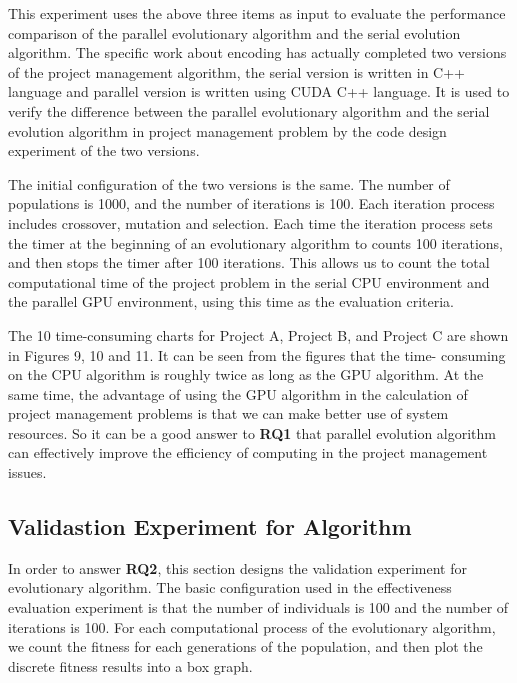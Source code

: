 
This experiment uses the above three items as input to evaluate the performance
comparison of the parallel evolutionary algorithm and the serial evolution
algorithm. The specific work about encoding has actually completed two versions
of the project management algorithm, the serial version is written in C++
language and parallel version is written using CUDA C++ language. It is used to
verify the difference between the parallel evolutionary algorithm and the serial
evolution algorithm in project management problem by the code design experiment
of the two versions.


The initial configuration of the two versions is the same. The number of
populations is 1000, and the number of iterations is 100. Each iteration process
includes crossover, mutation and selection.  Each time the iteration process
sets the timer at the beginning of an evolutionary algorithm to counts 100
iterations, and then stops the timer after 100 iterations. This allows us to
count the total computational time of the project problem in the serial CPU
environment and the parallel GPU environment, using this time as the evaluation
criteria.


The 10 time-consuming charts for Project A, Project B, and Project C are 
shown in Figures 9, 10 and 11. It can be seen from the figures that the time-
consuming on the CPU algorithm is roughly twice as long as the GPU algorithm. 
At the same time, the advantage of using the GPU algorithm in the calculation 
of project management problems is that we can make better use of system 
resources. So it can be a good answer to \textbf{RQ1} that parallel evolution 
algorithm can effectively improve the efficiency of computing in the project 
management issues.


\subsection{Validastion Experiment for Algorithm}
%
In order to answer \textbf{RQ2}, this section designs the validation experiment for 
evolutionary algorithm. The basic configuration used in the effectiveness 
evaluation experiment is that the number of individuals is 100 and the number 
of iterations is 100. For each computational 
process of the evolutionary algorithm, we count the fitness for each 
generations of the population, and then plot the discrete fitness results 
into a box graph.


